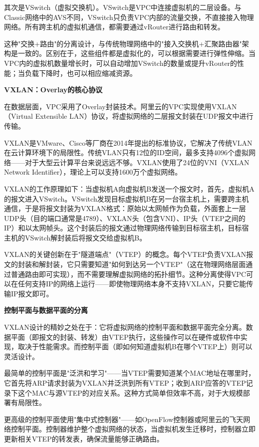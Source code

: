 其次是VSwitch（虚拟交换机）。VSwitch是VPC中连接虚拟机的二层设备。与Classic网络中的AVS不同，VSwitch只负责VPC内部的流量交换，不直接接入物理网络。所有跨主机的虚拟机通信，都需要通过vRouter进行路由和转发。

这种"交换+路由"的分离设计，与传统物理网络中的"接入交换机+汇聚路由器"架构是一致的。区别在于，这些组件都是虚拟化的，可以根据需要进行弹性伸缩。当VPC内的虚拟机数量增长时，可以自动增加VSwitch的数量或提升vRouter的性能；当负载下降时，也可以相应缩减资源。

\textbf{VXLAN：Overlay的核心协议}

在数据层面，VPC采用了Overlay封装技术。阿里云的VPC实现使用VXLAN（Virtual Extensible LAN）协议，将虚拟网络的二层报文封装在UDP报文中进行传输。

VXLAN是VMware、Cisco等厂商在2014年提出的标准协议，它解决了传统VLAN在云计算环境下的局限性。传统VLAN只有12位的ID空间，最多支持4096个虚拟网络——对于大型云计算平台来说远远不够。VXLAN使用了24位的VNI（VXLAN Network Identifier），理论上可以支持1600万个虚拟网络。

VXLAN的工作原理如下：当虚拟机A向虚拟机B发送一个报文时，首先，虚拟机A的报文进入VSwitch。VSwitch发现目标虚拟机B在另一台宿主机上，需要跨主机通信，于是将报文封装为VXLAN格式：原始以太网帧作为负载，外面套上一层UDP头（目的端口通常是4789）、VXLAN头（包含VNI）、IP头（VTEP之间的IP）和以太网帧头。这个封装后的报文通过物理网络传输到目标宿主机，目标宿主机的VSwitch解封装后将报文交给虚拟机B。

VXLAN的关键创新在于"隧道端点"（VTEP）的概念。每个VTEP负责VXLAN报文的封装和解封装，它只需要知道"如何到达另一个VTEP"（这在物理网络层面通过普通路由即可实现），而不需要理解虚拟网络的拓扑细节。这种分离使得VPC可以在任何支持IP的网络上运行——即使物理网络本身不支持VXLAN，只要它能传输IP报文即可。

\textbf{控制平面与数据平面的分离}

VXLAN设计的精妙之处在于：它将虚拟网络的控制平面和数据平面完全分离。数据平面（即报文的封装、转发）由VTEP执行，这些操作可以在硬件或软件中实现，取决于性能需求。而控制平面（即如何知道虚拟机B在哪个VTEP上）则可以灵活设计。

最简单的控制平面是"泛洪和学习"——当VTEP需要知道某个MAC地址在哪里时，它首先将ARP请求封装为VXLAN并泛洪到所有VTEP；收到ARP应答的VTEP记录下这个MAC与源VTEP的对应关系。这种方式简单但效率不高，对于大规模部署有局限性。

更高级的控制平面使用"集中式控制器"——如OpenFlow控制器或阿里云的飞天网络控制平面。控制器维护整个虚拟网络的状态，当虚拟机发生迁移时，控制器立即更新相关VTEP的转发表，确保流量能够正确路由。

